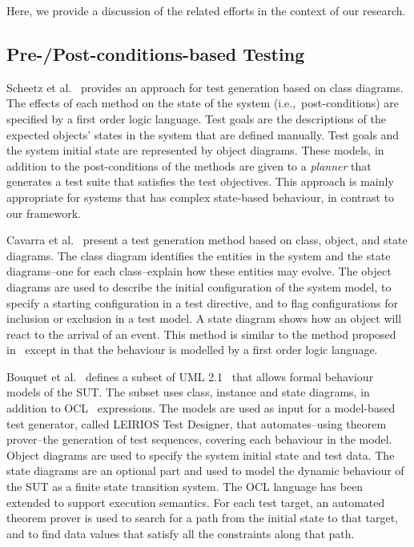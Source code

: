 %
%
\label{sec:related-work}
Here, we provide a discussion of the related efforts in the context of our research.

\subsection{Pre-/Post-conditions-based Testing}
Scheetz et al.~\cite{Scheetz1999} provides an approach for test generation based on class diagrams. The effects of each method on the state of the system (i.e.,\ post-conditions) are specified by a first order logic language. Test goals are the descriptions of the expected objects' states in the system that are defined manually. Test goals and the system initial state are represented by object diagrams. These models, in addition to the post-conditions of the methods are given to a \textit{planner} that generates a test suite that satisfies the test objectives. This approach is mainly appropriate for systems that has complex state-based behaviour, in contrast to our framework.

Cavarra et al.~\cite{Cavarra2002} present a test generation method based on class, object, and state diagrams. The class diagram identifies the entities in the system and the state diagrams--one for each class--explain how these entities may evolve. The object diagrams are used to describe the initial configuration of the system model, to specify a starting configuration in a test directive, and to flag configurations for inclusion or exclusion in a test model. A state diagram shows how an object will react to the arrival of an event. This method is similar to the method proposed in~\cite{Scheetz1999} except in that the behaviour is modelled by a first order logic language.

Bouquet et al.~\cite{Bouquet2007} defines a subset of UML 2.1~\cite{UML2} that allows formal behaviour models of the SUT. The subset uses class, instance and state diagrams, in addition to OCL~\cite{OCL} expressions. The models are used as input for a model-based test generator, called LEIRIOS Test Designer, that automates--using theorem prover--the generation of test sequences, covering each behaviour in the model. Object diagrams are used to specify the system initial state and test data. The state diagrams are an optional part and used to model the dynamic behaviour of the SUT as a finite state transition system. The OCL language has been extended to support execution semantics. For each test target, an automated theorem prover is used to search for a path from the initial state to that target, and to find data values that satisfy all the constraints along that path. 

